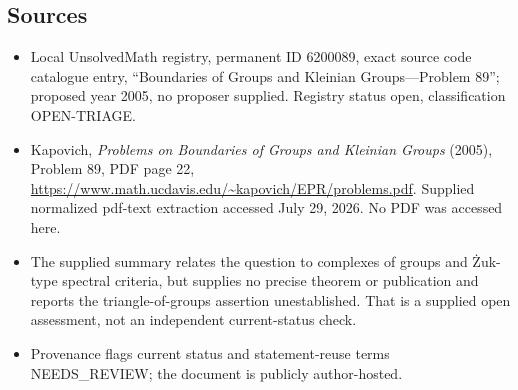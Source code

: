 \documentclass[11pt]{article}
\begin{document}
\subsection{Sources}
\begin{itemize}
\item Local UnsolvedMath registry, permanent ID 6200089, exact source code catalogue entry, ``Boundaries of Groups and Kleinian Groups---Problem 89''; proposed year 2005, no proposer supplied. Registry status open, classification OPEN-TRIAGE.
\item Kapovich, \emph{Problems on Boundaries of Groups and Kleinian Groups} (2005), Problem 89, PDF page 22, \url{https://www.math.ucdavis.edu/~kapovich/EPR/problems.pdf}. Supplied normalized pdf-text extraction accessed July 29, 2026. No PDF was accessed here.
\item The supplied summary relates the question to complexes of groups and Żuk-type spectral criteria, but supplies no precise theorem or publication and reports the triangle-of-groups assertion unestablished. That is a supplied open assessment, not an independent current-status check.
\item Provenance flags current status and statement-reuse terms NEEDS\_REVIEW; the document is publicly author-hosted.
\end{itemize}
\end{document}
